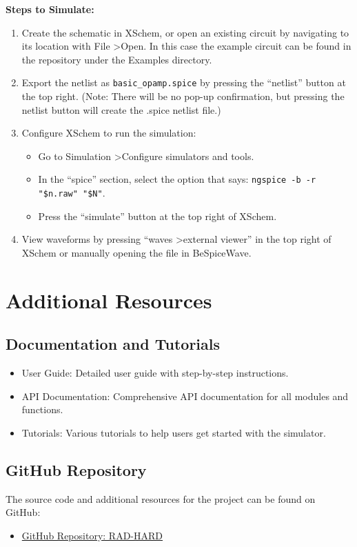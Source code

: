 \documentclass[12pt]{article}
\begin{document}
    \textbf{Steps to Simulate:}
    \begin{enumerate}
        \item Create the schematic in XSchem, or open an existing circuit by navigating to its location with File \textgreater Open. In this case the example circuit can be found in the repository under the Examples directory.
        \item Export the netlist as \texttt{basic_opamp.spice} by pressing the ``netlist'' button at the top right. (Note: There will be no pop-up confirmation, but pressing the netlist button will create the .spice netlist file.)
        \item Configure XSchem to run the simulation:
        \begin{itemize}
            \item Go to Simulation \textgreater Configure simulators and tools.
            \item In the ``spice'' section, select the option that says: \texttt{ngspice -b -r "\$n.raw" "\$N"}.
            \item Press the ``simulate'' button at the top right of XSchem.
        \end{itemize}
        \item View waveforms by pressing ``waves \textgreater external viewer'' in the top right of XSchem or manually opening the file in BeSpiceWave.
    \end{enumerate}


    \section{Additional Resources}\label{sec:additional-resources}

    \subsection{Documentation and Tutorials}\label{subsec:documentation-and-tutorials}
    \begin{itemize}
        \item User Guide: Detailed user guide with step-by-step instructions.
        \item API Documentation: Comprehensive API documentation for all modules and functions.
        \item Tutorials: Various tutorials to help users get started with the simulator.
    \end{itemize}

    \subsection{GitHub Repository}\label{subsec:github-repository}
    The source code and additional resources for the project can be found on GitHub:
    \begin{itemize}
        \item \href{https://github.com/Jacoba1100254352/RAD-HARD}{GitHub Repository: RAD-HARD}
    \end{itemize}
\end{document}
